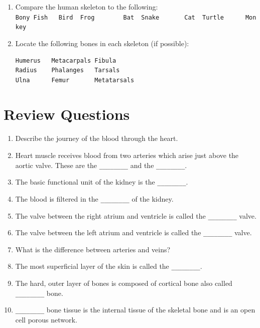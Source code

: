 \documentclass[]{book}
\providecommand{\tightlist}{%
  \setlength{\itemsep}{0pt}\setlength{\parskip}{0pt}}
\begin{document}
\begin{enumerate}
\def\labelenumi{\arabic{enumi}.}
\item
  Compare the human skeleton to the following:
  \texttt{Bony\ Fish\ \ \ Bird\ \ Frog\ \ \ \ \ \ \ \ Bat\ \ Snake\ \ \ \ \ \ \ Cat\ \ Turtle\ \ \ \ \ \ Monkey}
\item
  Locate the following bones in each skeleton (if possible):

\begin{verbatim}
Humerus   Metacarpals Fibula
Radius    Phalanges   Tarsals
Ulna      Femur       Metatarsals
\end{verbatim}
\end{enumerate}

\hypertarget{review-questions-9}{%
\section{Review Questions}\label{review-questions-9}}

\begin{enumerate}
\def\labelenumi{\arabic{enumi}.}
\tightlist
\item
  Describe the journey of the blood through the heart.
\item
  Heart muscle receives blood from two arteries which arise just above the aortic valve. These are the \texttt{\_\_\_\_\_\_\_\_} and the \texttt{\_\_\_\_\_\_\_\_}.
\item
  The basic functional unit of the kidney is the \texttt{\_\_\_\_\_\_\_\_}.
\item
  The blood is filtered in the \texttt{\_\_\_\_\_\_\_\_} of the kidney.
\item
  The valve between the right atrium and ventricle is called the \texttt{\_\_\_\_\_\_\_\_} valve.
\item
  The valve between the left atrium and ventricle is called the \texttt{\_\_\_\_\_\_\_\_} valve.
\item
  What is the difference between arteries and veins?
\item
  The most superficial layer of the skin is called the \texttt{\_\_\_\_\_\_\_\_}.
\item
  The hard, outer layer of bones is composed of cortical bone also called \texttt{\_\_\_\_\_\_\_\_} bone.
\item
  \texttt{\_\_\_\_\_\_\_\_} bone tissue is the internal tissue of the skeletal bone and is an open cell porous network.  
\end{enumerate}
\end{document}
